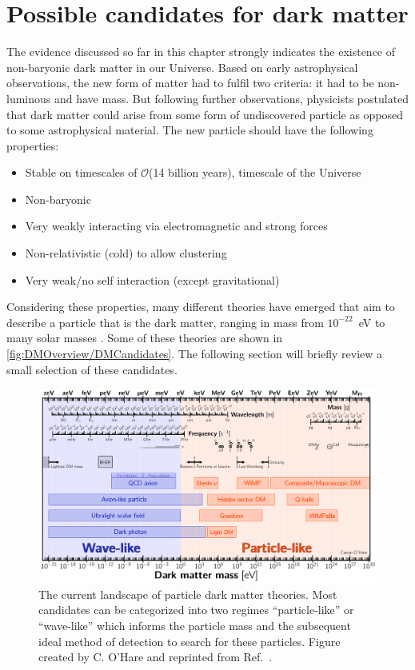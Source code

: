 \section{Possible candidates for dark matter}\label{sec:DMOverview/Candidates4DM}
The evidence discussed so far in this chapter strongly indicates the existence of non-baryonic dark matter in our Universe. Based on early astrophysical observations, the new form of matter had to fulfil two criteria: it had to be non-luminous and have mass. But following further observations, physicists postulated that dark matter could arise from some form of undiscovered particle as opposed to some astrophysical material. The new particle should have the following properties:
\begin{itemize}
    \item Stable on timescales of $\mathcal{O}$(14 billion years), timescale of the Universe
    \item Non-baryonic
    \item Very weakly interacting via electromagnetic and strong forces
    \item Non-relativistic (cold) to allow clustering
    \item Very weak/no self interaction (except gravitational)
\end{itemize}
Considering these properties, many different theories have emerged that aim to describe a particle that is the dark matter, ranging in mass from $10^{-22}$~eV to many solar masses \cite{DMPrimer}. Some of these theories are shown in \autoref{fig:DMOverview/DMCandidates}. The following section will briefly review a small selection of these candidates.

\begin{figure}[h!]
    \centering
    \includegraphics[width=\linewidth]{figures/DMOverview/Dark_matter_candidates.pdf}
    \caption[The current landscape of particle dark matter theories.]{The current landscape of particle dark matter theories. Most candidates can be categorized into two regimes ``particle-like'' or  ``wave-like'' which informs the particle mass and the subsequent ideal method of detection to search for these particles. Figure created by C. O'Hare and reprinted from Ref.~\cite{mwilliams:thesis}.}
    \label{fig:DMOverview/DMCandidates}
\end{figure}

